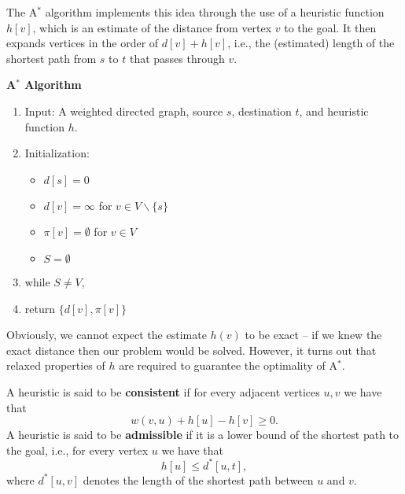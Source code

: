 The A$^*$ algorithm implements this idea through the use of a heuristic function $h[v]$, which is an estimate of the distance from vertex $v$ to the goal. It then expands vertices in the order of $d[v] + h[v]$, i.e., the (estimated) length of the shortest path from $s$ to $t$ that passes through $v$.

\begin{algorithm_}\textbf{A$^*$ Algorithm}
\begin{enumerate}
\item{Input:} A weighted directed graph, source $s$, destination $t$, and heuristic function $h$.

\item Initialization:
\begin{itemize}
  \item[] $d[s] = 0$
  \item[] $d[v] = \infty $ for $v \in V\backslash \{ s\} $
  \item[] $\pi [v] = \emptyset $ for $v \in V$
  \item[] $S = \emptyset $
\end{itemize}

\item while $S \ne V$,





\item return $\{ d[v],\pi [v]\} $
\end{enumerate}
\end{algorithm_}

Obviously, we cannot expect the estimate $h(v)$ to be exact -- if we knew the exact distance then our problem would be solved. However, it turns out that relaxed properties of $h$ are required to guarantee the optimality of A$^*$. 

\begin{definition}
A heuristic is said to be \textbf{consistent} if for every adjacent vertices $u,v$ we have that $$w(v,u)+h[u]-h[v] \geq 0.$$
A heuristic is said to be \textbf{admissible} if it is a lower bound of the shortest path to the goal, i.e., for every vertex $u$ we have that $$h[u] \leq d^*[u,t],$$
where $d^*[u,v]$ denotes the length of the shortest path between $u$ and $v$.
\end{definition}

